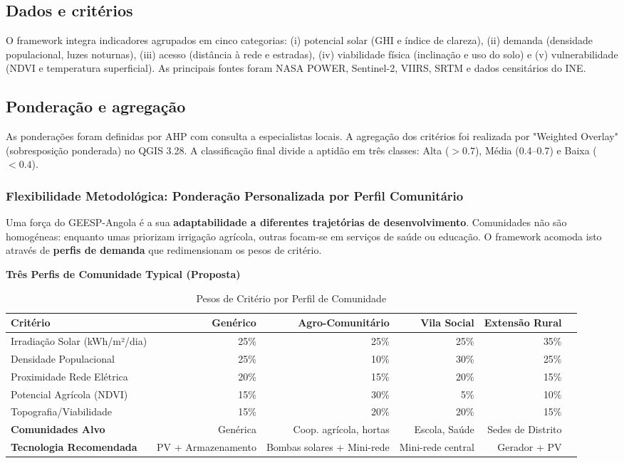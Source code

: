 \documentclass[12pt, a4paper]{article}
\begin{document}
\subsection{Dados e critérios}

O framework integra indicadores agrupados em cinco categorias: (i) potencial solar (GHI e índice de clareza), (ii) demanda (densidade populacional, luzes noturnas), (iii) acesso (distância à rede e estradas), (iv) viabilidade física (inclinação e uso do solo) e (v) vulnerabilidade (NDVI e temperatura superficial). As principais fontes foram NASA POWER, Sentinel-2, VIIRS, SRTM e dados censitários do INE.

\subsection{Ponderação e agregação}

As ponderações foram definidas por AHP com consulta a especialistas locais. A agregação dos critérios foi realizada por "Weighted Overlay" (sobresposição ponderada) no QGIS 3.28. A classificação final divide a aptidão em três classes: Alta (\(>0.7\)), Média (0.4--0.7) e Baixa (\(<0.4\)).

\subsubsection{Flexibilidade Metodológica: Ponderação Personalizada por Perfil Comunitário}

Uma força do GEESP-Angola é a sua \textbf{adaptabilidade a diferentes trajetórias de 
desenvolvimento}. Comunidades não são homogéneas: enquanto umas priorizam irrigação 
agrícola, outras focam-se em serviços de saúde ou educação. O framework acomoda 
isto através de \textbf{perfis de demanda} que redimensionam os pesos de critério.

\textbf{Três Perfis de Comunidade Typical (Proposta)}

\begin{table}[H]
\centering
\caption{Pesos de Critério por Perfil de Comunidade}
\label{tab:profiles_weights}
\footnotesize
\begin{tabular}{|l|r|r|r|r|r|}
\hline
\textbf{Critério} & \textbf{Genérico} & \textbf{Agro-Comunitário} & \textbf{Vila Social} & \textbf{Extensão Rural} \\
\hline
Irradiação Solar (kWh/m²/dia) & 25\% & 25\% & 25\% & 35\% \\
Densidade Populacional & 25\% & 10\% & 30\% & 25\% \\
Proximidade Rede Elétrica & 20\% & 15\% & 20\% & 15\% \\
Potencial Agrícola (NDVI) & 15\% & 30\% & 5\% & 10\% \\
Topografia/Viabilidade & 15\% & 20\% & 20\% & 15\% \\
\hline
\textbf{Comunidades Alvo} & Genérica & Coop. agrícola, hortas & Escola, Saúde & Sedes de Distrito \\
\hline
\textbf{Tecnologia Recomendada} & PV + Armazenamento & Bombas solares + Mini-rede & Mini-rede central & Gerador + PV \\
\hline
\end{tabular}
\end{table}
\end{document}
